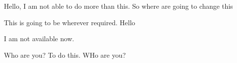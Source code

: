 \documentclass{article}
\begin{document}
Hello, I am not able to do more than this. So where are going to change this

This is going to be wherever required. Hello

I am not available now.

Who are you? To do this. WHo are you?
\end{document}

